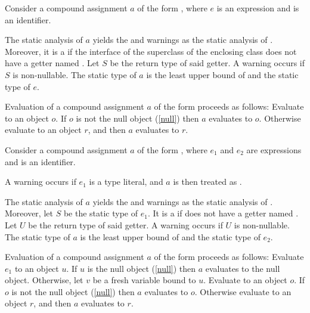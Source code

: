 \documentclass[makeidx]{article}
\begin{document}
{\LMHash{}%
Consider a compound assignment $a$ of the form ,
where $e$ is an expression and \id{} is an identifier.

\LMHash{}%
The static analysis of $a$ yields
the  and warnings as
the static analysis of .
Moreover, it is a 
if the interface of the superclass of the enclosing class
does not have a getter named \id.
Let $S$ be the return type of said getter.
A warning occurs if $S$ is non-nullable.
The static type of $a$ is the least upper bound of
 and the static type of $e$.

\LMHash{}%
Evaluation of a compound assignment $a$ of the form 
proceeds as follows:
Evaluate  to an object $o$.
If $o$ is not the null object (\ref{null}) then $a$ evaluates to $o$.
Otherwise evaluate  to an object $r$,
and then $a$ evaluates to $r$.
\EndCase

\LMHash{}%
Consider a compound assignment $a$ of the form ,
where $e_1$ and $e_2$ are expressions and \id{} is an identifier.

\LMHash{}%
A warning occurs if $e_1$ is a type literal,
and $a$ is then treated as .

\LMHash{}%
The static analysis of $a$ yields
the  and warnings as
the static analysis of .
Moreover, let $S$ be the static type of $e_1$.
It is a 
if  does not have a getter named \id.
Let $U$ be the return type of said getter.
A warning occurs if $U$ is non-nullable.
The static type of $a$ is the least upper bound of
 and the static type of $e_2$.

\LMHash{}%
Evaluation of a compound assignment $a$ of the form
proceeds as follows:
Evaluate $e_1$ to an object $u$.
If $u$ is the null object (\ref{null}) then $a$ evaluates to the null object.
Otherwise, let $v$ be a fresh variable bound to $u$.
Evaluate  to an object $o$.
If $o$ is not the null object (\ref{null}) then $a$ evaluates to $o$.
Otherwise evaluate  to an object $r$,
and then $a$ evaluates to $r$.
\EndCase

}
\end{document}
